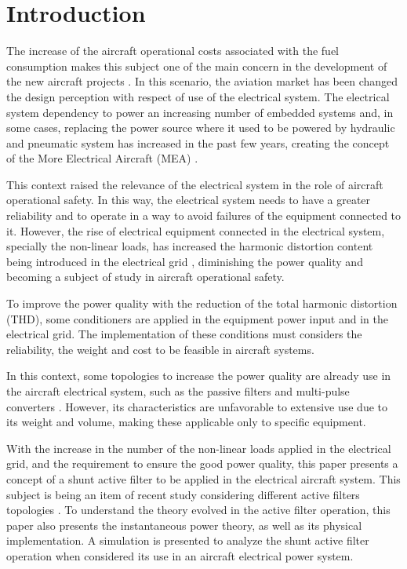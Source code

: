 \section{Introduction}

The increase of the aircraft operational costs associated with the fuel consumption makes this subject one of the main concern in the development of the new aircraft projects \cite{Babikian2002}. In this scenario, the aviation market has been changed the design perception with respect of use of the electrical system. The electrical system dependency to power an increasing number of embedded systems and, in some cases, replacing the power source where it used to be powered by hydraulic and pneumatic system has increased in the past few years, creating the concept of the More Electrical Aircraft (MEA) \cite{Moir1999}.

This context raised the relevance of the electrical system in the role of aircraft operational safety. In this way, the electrical system needs to have a greater reliability and to operate in a way to avoid failures of the equipment connected to it. However, the rise of electrical equipment connected in the electrical system, specially the non-linear loads, has increased the harmonic distortion content being introduced in the electrical grid \cite{Singer2012}, diminishing the power quality and becoming a subject of study in aircraft operational safety.

To improve the power quality with the reduction of the total harmonic distortion (THD), some conditioners are applied in the equipment power input and in the electrical grid. The implementation of these conditions must considers the reliability, the weight and cost to be feasible in aircraft systems.

In this context, some topologies to increase the power quality are already use in the aircraft electrical system, such as the passive filters and multi-pulse converters \cite{Zhu2014,Gong2003,Lobo2005}. However, its characteristics are unfavorable to extensive use due to its weight and volume, making these applicable only to specific equipment.

With the increase in the number of the non-linear loads applied in the electrical grid, and the requirement to ensure the good power quality, this paper presents a concept of a shunt active filter to be applied in the electrical aircraft system. This subject is being an item of recent study considering different active filters topologies \cite{Chen2012research,Chen2012novel,Chen2012control}. To understand the theory evolved in the active filter operation, this paper also presents the instantaneous power theory, as well as its physical implementation. A simulation is presented to analyze the shunt active filter operation when considered its use in an aircraft electrical power system.
